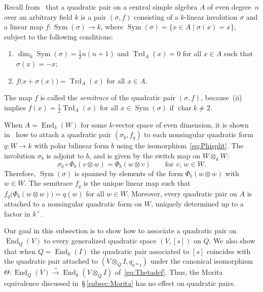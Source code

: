 \documentclass{amsart}
\DeclareMathOperator{\charac}{char}
\DeclareMathOperator{\End}{End}
\DeclareMathOperator{\Trd}{Trd}
\DeclareMathOperator{\Sym}{Sym}
\theoremstyle{remark}
\begin{document}
Recall from~\cite[\S\,5.B]{BoI} that a quadratic pair on a central
simple algebra $A$ of even degree~$n$ over an arbitrary field $k$ is a
pair $(\sigma,f)$ consisting of a $k$-linear involution $\sigma$ and a
linear map $f\colon\Sym(\sigma)\to k$, where $\Sym(\sigma) = \{x\in
A\mid \sigma(x)=x\}$, subject to the following conditions:
\begin{enumerate}
\item[(i)]
  $\dim_k\Sym(\sigma)=\frac12n(n+1)$ and $\Trd_A(x)=0$ for all $x\in
  A$ such that $\sigma(x)=-x$;
\item[(ii)]
  $f\bigl(x+\sigma(x)\bigr) = \Trd_A(x)$ for all $x\in A$.
\end{enumerate}
The map $f$ is called the \emph{semitrace} of the quadratic pair
$(\sigma,f)$, because~(ii) implies $f(x)=\frac12\Trd_A(x)$ for all
$x\in\Sym(\sigma)$ if $\charac k\neq2$.

When $A=\End_k(W)$ for some $k$-vector space of even dimension, it is
shown in~\cite[(5.11)]{BoI} how to attach a quadratic pair
$(\sigma_b,f_q)$ to each nonsingular quadratic form $q\colon W\to k$
with polar bilinear form $b$ using the isomorphism~\eqref{eq:Phisplit}. 
The involution $\sigma_b$ is adjoint to $b$, and is given by the
switch map on $W\otimes_kW$:
\[
  \sigma_b\circ\Phi_b(v\otimes w) = \Phi_b(w\otimes v)
  \qquad\text{for $v$, $w\in W$.}
\]
Therefore, $\Sym(\sigma)$ is spanned by elements of the form
$\Phi_b(w\otimes w)$ with $w\in W$.
The semitrace $f_q$ is the unique linear map such that
$f_q\bigl(\Phi_b(w\otimes w)\bigr) = q(w)$ for all $w\in W$. Moreover,
every quadratic pair on $A$ is 
attached to a nonsingular quadratic form on $W$, uniquely determined
up to a factor in $k^\times$.
\medbreak

Our goal in this subsection is to show how to associate a quadratic
pair on $\End_Q(V)$ to every generalized quadratic space $(V,[s])$ on
$Q$. We also show that when $Q=\End_k(I)$ the quadratic
pair associated to $[s]$ coincides with the quadratic pair attached to
$(V\otimes_QI,q_{a*s})$ under the canonical isomorphism
$\Theta\colon\End_Q(V)\xrightarrow{\sim}\End_k(V\otimes_QI)$
of~\eqref{eq:Thetadef}. Thus, the Morita equivalence discussed 
in~\S\,\ref{subsec:Morita} has no effect on quadratic pairs.
\medbreak
\end{document}
